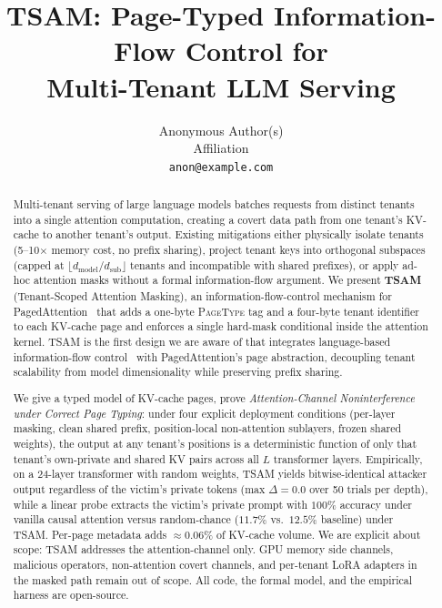 \documentclass[11pt]{article}
\title{TSAM: Page-Typed Information-Flow Control for\\
Multi-Tenant LLM Serving}
\author{%
  Anonymous Author(s)\\
  Affiliation\\
  \texttt{anon@example.com}%
}
\begin{document}
\maketitle

\begin{abstract}
Multi-tenant serving of large language models batches requests from
distinct tenants into a single attention computation, creating a covert
data path from one tenant's KV-cache to another tenant's output.  Existing
mitigations either physically isolate tenants (5--10$\times$ memory cost,
no prefix sharing), project tenant keys into orthogonal subspaces (capped
at $\lfloor d_{\mathrm{model}}/d_{\mathrm{sub}} \rfloor$ tenants and
incompatible with shared prefixes), or apply ad-hoc attention masks
without a formal information-flow argument.  We present \textbf{TSAM}
(Tenant-Scoped Attention Masking), an information-flow-control mechanism
for PagedAttention~\citep{kwon2023vllm} that adds a one-byte
\textsc{Page\-Type} tag and a four-byte tenant identifier to each KV-cache
page and enforces a single hard-mask conditional inside the attention
kernel.  TSAM is the first design we are aware of that integrates
language-based information-flow control~\citep{denning1976lattice,
goguen1982security, sabelfeld2003language} with PagedAttention's page
abstraction, decoupling tenant scalability from model dimensionality
while preserving prefix sharing.

We give a typed model of KV-cache pages, prove
\emph{Attention-Channel Noninterference under Correct Page Typing}: under
four explicit deployment conditions (per-layer masking, clean shared
prefix, position-local non-attention sublayers, frozen shared weights),
the output at any tenant's positions is a deterministic function of only
that tenant's own-private and shared KV pairs across all $L$ transformer
layers.  Empirically, on a 24-layer transformer with random weights, TSAM
yields bitwise-identical attacker output regardless of the victim's
private tokens (max $\Delta = 0.0$ over 50 trials per depth), while a
linear probe extracts the victim's private prompt with $100\%$ accuracy
under vanilla causal attention versus random-chance ($11.7\%$ vs.\ $12.5\%$
baseline) under TSAM.  Per-page metadata adds $\approx$0.06\% of KV-cache
volume.  We are explicit about scope: TSAM addresses the
attention-channel only.  GPU memory side channels, malicious operators,
non-attention covert channels, and per-tenant LoRA adapters in the masked
path remain out of scope.  All code, the formal model, and the empirical
harness are open-source.
\end{abstract}
\end{document}
